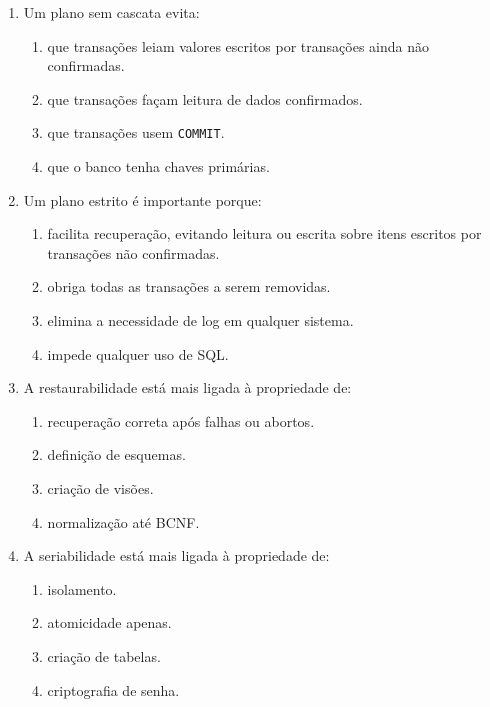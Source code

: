 \documentclass[12pt,a4paper]{article}
\begin{document}
\begin{enumerate}[label=\textbf{Q\arabic*.}]
\item Um plano sem cascata evita:

\begin{enumerate}[label=\alph*)]
    \item que transações leiam valores escritos por transações ainda não confirmadas.
    \item que transações façam leitura de dados confirmados.
    \item que transações usem \texttt{COMMIT}.
    \item que o banco tenha chaves primárias.
\end{enumerate}

\item Um plano estrito é importante porque:

\begin{enumerate}[label=\alph*)]
    \item facilita recuperação, evitando leitura ou escrita sobre itens escritos por transações não confirmadas.
    \item obriga todas as transações a serem removidas.
    \item elimina a necessidade de log em qualquer sistema.
    \item impede qualquer uso de SQL.
\end{enumerate}

\item A restaurabilidade está mais ligada à propriedade de:

\begin{enumerate}[label=\alph*)]
    \item recuperação correta após falhas ou abortos.
    \item definição de esquemas.
    \item criação de visões.
    \item normalização até BCNF.
\end{enumerate}

\item A seriabilidade está mais ligada à propriedade de:

\begin{enumerate}[label=\alph*)]
    \item isolamento.
    \item atomicidade apenas.
    \item criação de tabelas.
    \item criptografia de senha.
\end{enumerate}


\end{enumerate}
\end{document}
